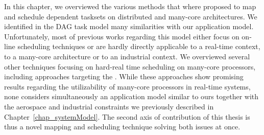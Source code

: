 \documentclass[main.tex]{subfiles}
\begin{document}
In this chapter, we overviewed the various methods that where proposed to map and schedule dependent tasksets on distributed and many-core architectures. We identified in the DAG task model many similarities with our application model. Unfortunately, most of previous works regarding this model either focus on on-line scheduling techniques or are hardly directly applicable to a real-time context, to a many-core architecture or to an industrial context. We overviewed several other techniques focusing on hard-real time scheduling on many-core processors, including approaches targeting the \mppalong. While these approaches show promising results regarding the utilizability of many-core processors in real-time systems, none considers simultaneously an application model similar to ours together with the aerospace and industrial constraints we previously described in Chapter~\ref{chap_systemModel}. The second axis of contribution of this thesis is thus a novel mapping and scheduling technique solving both issues at once.

\clearpage
\subbiblio
\end{document}
